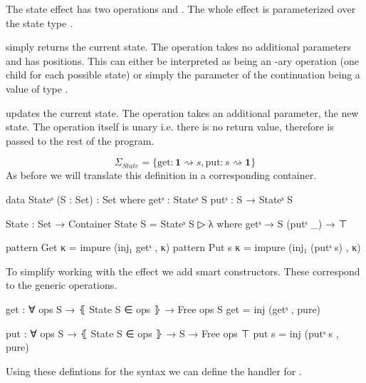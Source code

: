 The state effect has two operations  and .
The whole effect is parameterized over the state type .

 simply returns the current state.
The operation takes no additional parameters and has  positions.
This can either be interpreted as  being an
-ary operation (one child for each possible state) or simply the
parameter of the continuation being a value of type .

 updates the current state.
The operation takes an additional parameter, the new state.
The operation itself is unary i.e. there is no return value, therefore %
 is passed to the rest of the program.

$$
\Sigma_{State} = \{ \mathrm{get} : \mathbf{1} \rightsquigarrow s, \mathrm{put} :
s \rightsquigarrow \mathbf{1} \}
$$
As before we will translate this definition in a corresponding container.

\begin{code}
data Stateˢ (S : Set) : Set where
  getˢ : Stateˢ S
  putˢ : S → Stateˢ S

State : Set → Container
State S = Stateˢ S ▷ λ where
  getˢ      → S
  (putˢ _)  → ⊤

pattern Get κ  = impure (inj₁ getˢ , κ)
pattern Put s κ  = impure (inj₁ (putˢ s) , κ)
\end{code}
To simplify working with the  effect we add smart
constructors.
These correspond to the generic operations.

\begin{code}
get : ∀ {ops S} → ⦃ State S ∈ ops ⦄ → Free ops S
get = inj (getˢ , pure)

put : ∀ {ops S} → ⦃ State S ∈ ops ⦄ → S → Free ops ⊤
put s = inj (putˢ s , pure)
\end{code}
Using these defintions for the syntax we can define the handler for
.

